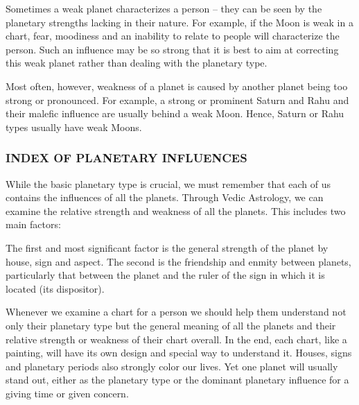  

Sometimes a weak planet characterizes a person – they can be seen by the planetary strengths lacking in their nature. For example, if the Moon is weak in a chart, fear, moodiness and an inability to relate to people will characterize the person. Such an influence may be so strong that it is best to aim at correcting this weak planet rather than dealing with the planetary type.

 

Most often, however, weakness of a planet is caused by another planet being too strong or pronounced. For example, a strong or prominent Saturn and Rahu and their malefic influence are usually behind a weak Moon. Hence, Saturn or Rahu types usually have weak Moons.

 

\subsubsection{INDEX OF PLANETARY INFLUENCES }

 

While the basic planetary type is crucial, we must remember that each of us contains the influences of all the planets. Through Vedic Astrology, we can examine the relative strength and weakness of all the planets. This includes two main factors:

 

The first and most significant factor is the general strength of the planet by house, sign and aspect.
The second is the friendship and enmity between planets, particularly that between the planet and the ruler of the sign in which it is located (its dispositor).
 

Whenever we examine a chart for a person we should help them understand not only their planetary type but the general meaning of all the planets and their relative strength or weakness of their chart overall. In the end, each chart, like a painting, will have its own design and special way to understand it. Houses, signs and planetary periods also strongly color our lives. Yet one planet will usually stand out, either as the planetary type or the dominant planetary influence for a giving time or given concern.